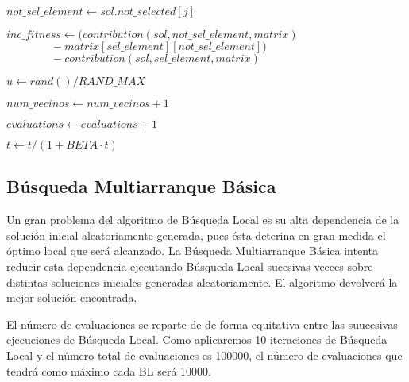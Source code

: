 \documentclass[10pt,a4paper]{article}
\begin{document}
\begin{algorithm}[H]
{{{				$not\_sel\_element \gets sol.not\_selected[j]$
				
				$inc\_fitness \gets ( contribution(sol,not\_sel\_element,matrix)$\\$\qquad\qquad - matrix[sel\_element][not\_sel\_element] )$\\$\qquad\qquad - contribution(sol,sel\_element,matrix)$
				
				$u \gets rand()/RAND\_MAX$
				
				
				$num\_vecinos \gets num\_vecinos + 1$
				
				$evaluations \gets evaluations + 1$
			}
			
			$t \gets t/(1+BETA \cdot t)$
		}
		
		
	}
\end{algorithm}

\subsection{Búsqueda Multiarranque Básica}

Un gran problema del algoritmo de Búsqueda Local es su alta dependencia de la solución inicial aleatoriamente generada, pues ésta deterina en gran medida el óptimo local que será alcanzado. La Búsqueda Multiarranque Básica intenta reducir esta dependencia ejecutando Búsqueda Local sucesivas vecces sobre distintas soluciones iniciales generadas aleatoriamente. El algoritmo devolverá la mejor solución encontrada.

El número de evaluaciones se reparte de de forma equitativa entre las suucesivas ejecuciones de Búsqueda Local. Como aplicaremos 10 iteraciones de Búsqueda Local y el número total de evaluaciones es 100000, el número de evaluaciones que tendrá como máximo cada BL será 10000.\\
\end{document}
